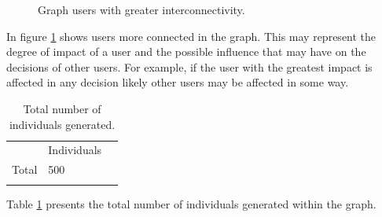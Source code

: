 \begin{figure}
\centering
{} %
\caption{Graph users with greater interconnectivity.}
\label{fig:guserknown_1}
\end{figure}

In figure \ref{fig:guserknown_1} shows users more connected in the graph. This
may represent the degree of impact of a user and the possible influence that may
have on the decisions of other users. For example, if the user with the greatest
impact is affected in any decision likely other users may be affected in some
way.


\begin{table}
\small
\caption{Total number of individuals generated.}
\label{tab:totalIndividuals_12}
\centering
\small
\begin{tabular}{p{3cm} p{3cm} p{3cm} }
\hline\noalign{\smallskip}
  & Individuals &  \\
\noalign{\smallskip}\hline\noalign{\smallskip}
\small{Total } & \small{500} & \\ \hline
\noalign{\smallskip}\hline
\end{tabular}
\end{table}


Table \ref{tab:totalIndividuals_12} presents the total number of individuals
generated within the graph.


